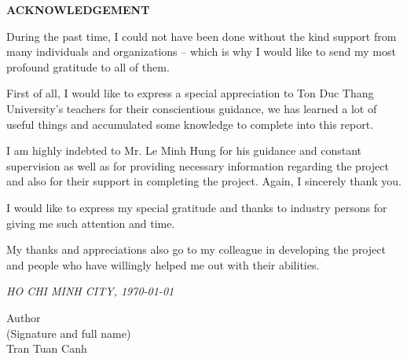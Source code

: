 \newpage	
\vspace{5cm} 

\begin{center}
	{
		\fontsize{16pt}{1}\selectfont
		\textbf{ACKNOWLEDGEMENT}
	}
\end{center} 		
	\noindent
	
	During the past time, I could not have been done without the kind support from many individuals and organizations – which is why I would like to send my most profound gratitude to all of them.
	
	First of all, I would like to express a special appreciation to Ton Duc Thang University’s teachers for their conscientious guidance, we has learned a lot of useful things and accumulated some knowledge to complete into this report. 
	
	I am highly indebted to Mr. Le Minh Hung for his guidance and constant supervision as well as for providing necessary information regarding the project and also for their support in completing the project. Again, I sincerely thank you.
	
	I would like to express my special gratitude and thanks to industry persons for giving me such attention and time.
	
	My thanks and appreciations also go to my colleague in developing the project and people who have willingly helped me out with their abilities.



\vspace{0.15cm}


\begin{flushright}
	{\it HO CHI MINH CITY, \today{} }
	
	Author \hskip 2cm\quad
	~\\
	(Signature and full name) \hskip 0.4cm\quad
	~\\[1.5cm] 
	Tran Tuan Canh\hskip 1.5cm\quad
	
	
\end{flushright}
